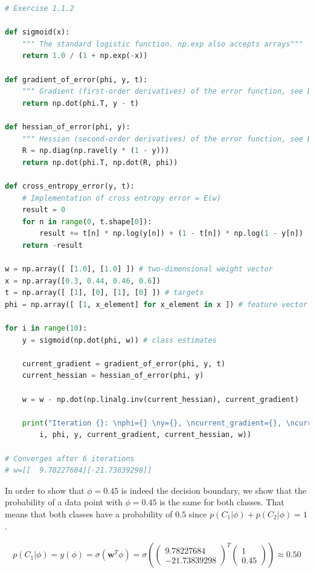 \documentclass[a4paper]{article}
\begin{document}
\begin{lstlisting}[language=Python]
# Exercise 1.1.2

def sigmoid(x):
    """ The standard logistic function. np.exp also accepts arrays"""
    return 1.0 / (1 + np.exp(-x))

def gradient_of_error(phi, y, t):
    """ Gradient (first-order derivatives) of the error function, see Bishop page 207, eq. 4.96 """
    return np.dot(phi.T, y - t)

def hessian_of_error(phi, y):
    """ Hessian (second-order derivatives) of the error function, see Bishop page 207, eq. 4.97 """
    R = np.diag(np.ravel(y * (1 - y)))
    return np.dot(phi.T, np.dot(R, phi))

def cross_entropy_error(y, t):
    # Implementation of cross entropy error = E(w)
    result = 0
    for n in range(0, t.shape[0]):
        result += t[n] * np.log(y[n]) + (1 - t[n]) * np.log(1 - y[n])
    return -result

w = np.array([ [1.0], [1.0] ]) # two-dimensional weight vector
x = np.array([0.3, 0.44, 0.46, 0.6])
t = np.array([ [1], [0], [1], [0] ]) # targets
phi = np.array([ [1, x_element] for x_element in x ]) # feature vector

for i in range(10):
    y = sigmoid(np.dot(phi, w)) # class estimates
    
    current_gradient = gradient_of_error(phi, y, t)
    current_hessian = hessian_of_error(phi, y)
    
    w = w - np.dot(np.linalg.inv(current_hessian), current_gradient)
    
    print("Iteration {}: \nphi={} \ny={}, \ncurrent_gradient={}, \ncurrent_hessian={}, \nw={}\n".format(
        i, phi, y, current_gradient, current_hessian, w))
    
# Converges after 6 iterations  
# w=[[  9.78227684][-21.73839298]]
\end{lstlisting}

\vspace{1em}

In order to show that $\phi = 0.45$ is indeed the decision boundary, we  show that the probability of a data point with $\phi = 0.45$ is the same for both classes. That means that both classes have a probability of  $0.5$ since $p(C_1 \vert \phi) + p(C_2 \vert \phi) = 1$.

		\begin{align*}
			p(C_1 \vert \phi) = y(\phi) = \sigma (\boldsymbol w^T \phi) = \sigma (\begin{pmatrix} 9.78227684 \\ -21.73839298 \end{pmatrix}^T \begin{pmatrix} 1\\0.45 \end{pmatrix}) \approx 0.50
		\end{align*}
\end{document}
